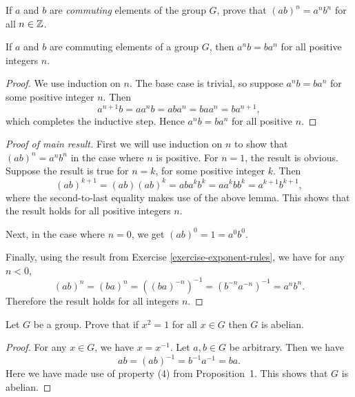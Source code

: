  If $a$ and $b$ are {\em commuting} elements of the group
$G$, prove that $(ab)^n = a^nb^n$ for all $n\in\mathbb{Z}$.
\begin{lem}
  If $a$ and $b$ are commuting elements of a group $G$, then
  $a^nb = ba^n$ for all positive integers $n$.
\end{lem}
\begin{proof}
  We use induction on $n$. The base case is trivial, so suppose
  $a^nb = ba^n$ for some positive integer $n$. Then
  \begin{equation*}
    a^{n+1}b = aa^nb = aba^n = baa^n = ba^{n+1},
  \end{equation*}
  which completes the inductive step. Hence $a^nb = ba^n$ for all
  positive $n$.
\end{proof}
\begin{proof}[Proof of main result]
  First we will use induction on $n$ to show that $(ab)^n = a^nb^n$ in
  the case where $n$ is positive. For $n = 1$, the result is
  obvious. Suppose the result is true for $n = k$, for some positive
  integer $k$. Then
  \begin{equation*}
    (ab)^{k+1} = (ab)(ab)^k = aba^kb^k
    = aa^kbb^k = a^{k+1}b^{k+1},
  \end{equation*}
  where the second-to-last equality makes use of the above lemma. This
  shows that the result holds for all positive integers $n$.

  Next, in the case where $n = 0$, we get $(ab)^0 = 1 = a^0b^0$.

  Finally, using the result from Exercise
  \ref{exercise-exponent-rules}, we have for any $n<0$,
  \begin{equation*}
    (ab)^n = (ba)^n = \left((ba)^{-n}\right)^{-1}
    = \left(b^{-n}a^{-n}\right)^{-1}
    = a^nb^n.
  \end{equation*}
  Therefore the result holds for all integers $n$.
\end{proof}

 Let $G$ be a group. Prove that if $x^2 = 1$ for all
$x\in G$ then $G$ is abelian.
\begin{proof}
  For any $x\in G$, we have $x = x^{-1}$. Let $a,b\in G$ be
  arbitrary. Then we have
  \begin{equation*}
    ab = (ab)^{-1} = b^{-1}a^{-1} = ba.
  \end{equation*}
  Here we have made use of property (4) from Proposition~1. This shows
  that $G$ is abelian.
\end{proof}

